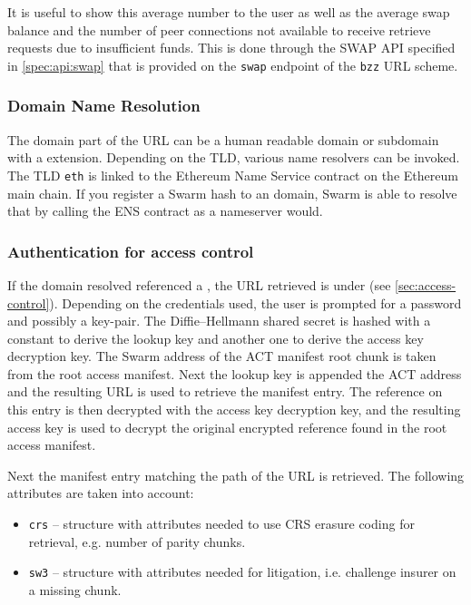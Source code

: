 It is useful to show this average number to the user as well as the average swap balance and the number of peer connections not available to receive retrieve requests due to insufficient funds. This is done through the SWAP API specified in \ref{spec:api:swap} that is provided on the \lstinline{swap} endpoint of the \lstinline{bzz} URL scheme.


\subsubsection{Domain Name Resolution}

The domain part of the URL can be a human readable domain or subdomain with a  extension. Depending on the TLD, various name resolvers can be invoked. The TLD \lstinline{eth} is linked to the Ethereum Name Service contract on the Ethereum main chain. If you register a Swarm hash to an  domain, Swarm is able to resolve that by calling the ENS contract as a nameserver would. 

\subsubsection{Authentication for access control}

If the domain resolved referenced a , the URL retrieved is under  (see \ref{sec:access-control}). 
Depending on the credentials used, the user is prompted for a password and possibly a key-pair. 
The Diffie--Hellmann shared secret is hashed with a constant to derive the lookup key and another one to derive the access key decryption key. The Swarm address of the ACT manifest root chunk is taken from the root access manifest. 
Next the lookup key is appended the ACT address and the resulting URL is used to retrieve the manifest entry. The reference on this entry is then decrypted with the access key decryption key, and the resulting access key is used to decrypt the original encrypted reference found in the root access manifest.

Next the manifest entry matching the path of the URL is retrieved. The following attributes are taken into account:

\begin{itemize}
    \item \lstinline{crs} -- {
    structure with attributes needed to use CRS erasure coding for retrieval, e.g. number of parity chunks}.
    \item \lstinline{sw3} -- { structure with attributes needed for litigation, i.e. challenge insurer on a missing chunk}. 
\end{itemize}


